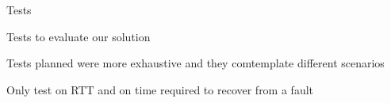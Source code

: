 \begin{frame}{Tests}

  Tests to evaluate our solution

  \vfill{}

  Tests planned were more exhaustive and they comtemplate different scenarios

  \vfill{}

  Only test on RTT and on time required to recover from a fault

\end{frame}